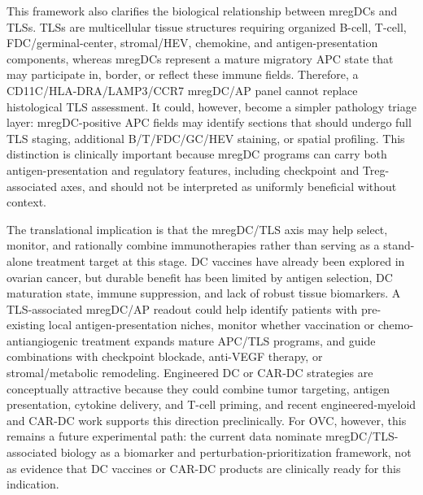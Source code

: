 \documentclass[pdflatex,sn-vancouver-num]{sn-jnl}
\begin{document}
This framework also clarifies the biological relationship between mregDCs and TLSs. TLSs are multicellular tissue structures requiring organized B-cell, T-cell, FDC/germinal-center, stromal/HEV, chemokine, and antigen-presentation components, whereas mregDCs represent a mature migratory APC state that may participate in, border, or reflect these immune fields. Therefore, a CD11C/HLA-DRA/LAMP3/CCR7 mregDC/AP panel cannot replace histological TLS assessment. It could, however, become a simpler pathology triage layer: mregDC-positive APC fields may identify sections that should undergo full TLS staging, additional B/T/FDC/GC/HEV staining, or spatial profiling. This distinction is clinically important because mregDC programs can carry both antigen-presentation and regulatory features, including checkpoint and Treg-associated axes, and should not be interpreted as uniformly beneficial without context\cite{bib75,bib99,bib104,bib110}.

The translational implication is that the mregDC/TLS axis may help select, monitor, and rationally combine immunotherapies rather than serving as a stand-alone treatment target at this stage. DC vaccines have already been explored in ovarian cancer, but durable benefit has been limited by antigen selection, DC maturation state, immune suppression, and lack of robust tissue biomarkers\cite{bib69}. A TLS-associated mregDC/AP readout could help identify patients with pre-existing local antigen-presentation niches, monitor whether vaccination or chemo-antiangiogenic treatment expands mature APC/TLS programs, and guide combinations with checkpoint blockade, anti-VEGF therapy, or stromal/metabolic remodeling. Engineered DC or CAR-DC strategies are conceptually attractive because they could combine tumor targeting, antigen presentation, cytokine delivery, and T-cell priming, and recent engineered-myeloid and CAR-DC work supports this direction preclinically\cite{bib103,bib124}. For OVC, however, this remains a future experimental path: the current data nominate mregDC/TLS-associated biology as a biomarker and perturbation-prioritization framework, not as evidence that DC vaccines or CAR-DC products are clinically ready for this indication.
\end{document}
